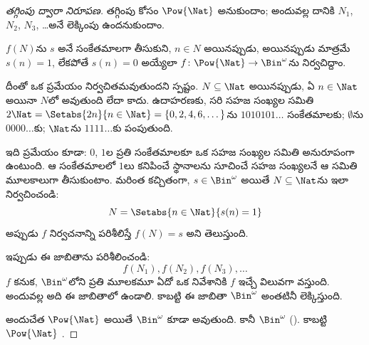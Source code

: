 \documentclass[../../../include/open-logic-section]{subfiles}
\begin{document}
\begin{proof}[తగ్గింపు ద్వారా {} నిరూపణ]
తగ్గింపు కోసం $\Pow{\Nat}$  అనుకుందాం; అందువల్ల దానికి
$N_{1}$, $N_{2}$, $N_{3}$, \dots అనే లెక్కింపు ఉందనుకుందాం.

$f(N)$ను $s$ అనే సంకేతమాలగా తీసుకుని, $n \in N$ అయినప్పుడు, అయినప్పుడు మాత్రమే
$s(n) = 1$, లేకపోతే $s(n) = 0$ అయ్యేలా
$f \colon \Pow{\Nat} \to \Bin^\omega$ను నిర్వచిద్దాం.

దీంతో ఒక ప్రమేయం నిర్వచితమవుతుందని స్పష్టం. $N \subseteq \Nat$
అయినప్పుడు, ఏ $n \in \Nat$ అయినా $N$లో  అవుతుంది
లేదా కాదు. ఉదాహరణకు, సరి సహజ సంఖ్యల సమితి
$2\Nat = \Setabs{2n}{n \in \Nat} = \{0,2, 4, 6, \dots\}$ను
$1010101\dots$ సంకేతమాలకు; $\emptyset$ను $0000\dots$కు; $\Nat$ను
$1111\dots$కు పంపుతుంది.

ఇది  ప్రమేయం కూడా: $0$, $1$ల ప్రతి సంకేతమాలకూ ఒక సహజ
సంఖ్యల సమితి అనురూపంగా ఉంటుంది. ఆ సంకేతమాలలో $1$లు కనిపించే స్థానాలను సూచించే సహజ
సంఖ్యలనే ఆ సమితి మూలకాలుగా తీసుకుంటాం. మరింత కచ్చితంగా,
$s \in \Bin^\omega$ అయితే $N \subseteq \Nat$ను ఇలా నిర్వచించండి:
\[
N = \Setabs{n \in \Nat}{s(n) = 1}
\]
అప్పుడు $f$ నిర్వచనాన్ని పరిశీలిస్తే $f(N) = s$ అని తెలుస్తుంది.

ఇప్పుడు ఈ జాబితాను పరిశీలించండి:
\[
f(N_1), f(N_2), f(N_3), \dots
\]
$f$  కనుక, $\Bin^\omega$లోని ప్రతి మూలకమూ ఏదో ఒక
నివేశానికి $f$ ఇచ్చే విలువగా వస్తుంది. అందువల్ల అది ఈ జాబితాలో ఉండాలి.
కాబట్టి ఈ జాబితా $\Bin^\omega$ అంతటినీ లెక్కిస్తుంది.

అందుచేత $\Pow{\Nat}$  అయితే $\Bin^\omega$ కూడా
 అవుతుంది. కానీ $\Bin^\omega$ 
(). కాబట్టి $\Pow{\Nat}$
.
\end{proof}

\end{document}
